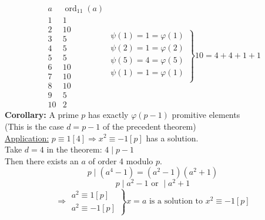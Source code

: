 \documentclass{report}
\DeclareMathOperator{\ord}{ord}
\begin{document}
\[
\begin{array}{l|cr}
				a & \ord_11(a)  \\
				\hline
				1 & 1 \\
				2 & 10 \\
				3 & 5 \\
				4 & 5 \\
				5 & 5\\
				6 & 10\\
				7 & 10\\
				8 & 10\\
				9 & 5\\
				10 & 2
\end{array}
\left.
\begin{array}{lcr}
			 \psi(1)=1=\varphi(1)\\
			\psi(2)=1=\varphi(2)\\
			\psi(5)=4=\varphi(5)\\
			\psi(1)=1=\varphi(1)\\
\end{array}
\right \} 
10=4+4+1+1									
\]
\textbf{Corollary:} A prime $p$ has exactly $\varphi(p-1)$ promitive elements \\ (This is the case $d=p-1$ of the precedent theorem)\\
\underline{Application:} $p\equiv 1[4] \Rightarrow x^2\equiv -1[p]$ has a solution.\\
													Take $d=4$ in the theorem: $4 \mid p-1$\\
													Then there exists an $a$ of order 4 modulo $p$.\\
													\[p \mid (a^4-1)=(a^2-1)(a^2+1)\]
													\[p \mid a^2-1 \text{  or  } \mid a^2+1\]
													\[\Rightarrow \left. \begin{array}{lcl}
																								a^2 \equiv 1[p]\\
																								a^2 \equiv -1[p]
																								\end{array}
																								\right \} x=a \text{ is a solution to   } x^2 \equiv -1[p]\]
\newpage
\end{document}
